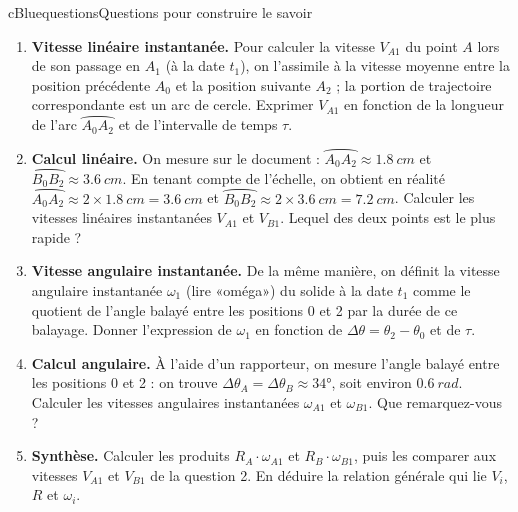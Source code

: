 \documentclass[11pt,a4paper]{article}
\newcommand\og{«\nobreak\thinspace}
\newcommand\fg{\nobreak\thinspace»}
\newcommand{\arc}[1]{\overparen{#1}}
\newcommand{\kw}[1]{{\sffamily\bfseries\color{cBlue}#1}}   %
\begin{document}
\begin{rub}{cBlue}{questions}{Questions pour construire le savoir}
\begin{enumerate}
  \item \kw{Vitesse linéaire instantanée.} Pour calculer la vitesse $V_{A1}$ du point $A$ lors de son passage en $A_1$ (à la date $t_1$), on l’assimile à la vitesse moyenne entre la position précédente $A_0$ et la position suivante $A_2$ ; la portion de trajectoire correspondante est un arc de cercle. Exprimer $V_{A1}$ en fonction de la longueur de l’arc $\arc{A_0A_2}$ et de l’intervalle de temps $\tau$.
  \item \kw{Calcul linéaire.} On mesure sur le document : $\arc{A_0A_2} \approx \qty{1,8}{cm}$ et $\arc{B_0B_2} \approx \qty{3,6}{cm}$. En tenant compte de l’échelle, on obtient en réalité $\arc{A_0A_2} \approx 2\times\qty{1,8}{cm} = \qty{3,6}{cm}$ et $\arc{B_0B_2} \approx 2\times\qty{3,6}{cm} = \qty{7,2}{cm}$.
  Calculer les vitesses linéaires instantanées $V_{A1}$ et $V_{B1}$. Lequel des deux points est le plus rapide ?
  \item \kw{Vitesse angulaire instantanée.} De la même manière, on définit la vitesse angulaire instantanée $\omega_1$ (lire \og oméga\fg{}) du solide à la date $t_1$ comme le quotient de l’angle balayé entre les positions 0 et 2 par la durée de ce balayage. Donner l’expression de $\omega_1$ en fonction de $\Delta\theta = \theta_2 - \theta_0$ et de $\tau$.
  \item \kw{Calcul angulaire.} À l’aide d’un rapporteur, on mesure l’angle balayé entre les positions 0 et 2 : on trouve $\Delta\theta_A = \Delta\theta_B \approx \ang{34}$, soit environ $\qty{0,6}{rad}$. Calculer les vitesses angulaires instantanées $\omega_{A1}$ et $\omega_{B1}$. Que remarquez-vous ?
  \item \kw{Synthèse.} Calculer les produits $R_A\cdot\omega_{A1}$ et $R_B\cdot\omega_{B1}$, puis les comparer aux vitesses $V_{A1}$ et $V_{B1}$ de la question 2. En déduire la relation générale qui lie $V_i$, $R$ et $\omega_i$.
\end{enumerate}
\end{rub}
\end{document}
